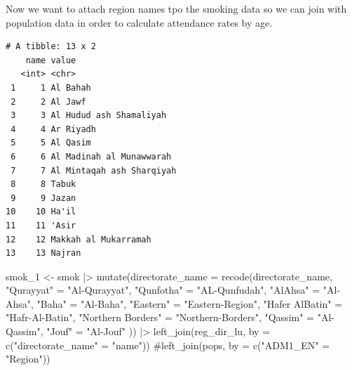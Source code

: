 \documentclass[
  letterpaper,
  DIV=11,
  numbers=noendperiod]{scrreprt}
\newenvironment{Shaded}{\begin{snugshade}}{\end{snugshade}}
\newcommand{\AttributeTok}[1]{\textcolor[rgb]{0.40,0.45,0.13}{#1}}
\newcommand{\CommentTok}[1]{\textcolor[rgb]{0.37,0.37,0.37}{#1}}
\newcommand{\FunctionTok}[1]{\textcolor[rgb]{0.28,0.35,0.67}{#1}}
\newcommand{\NormalTok}[1]{\textcolor[rgb]{0.00,0.23,0.31}{#1}}
\newcommand{\OtherTok}[1]{\textcolor[rgb]{0.00,0.23,0.31}{#1}}
\newcommand{\SpecialCharTok}[1]{\textcolor[rgb]{0.37,0.37,0.37}{#1}}
\newcommand{\StringTok}[1]{\textcolor[rgb]{0.13,0.47,0.30}{#1}}
\begin{document}
Now we want to attach region names tpo the smoking data so we can join
with population data in order to calculate attendance rates by age.

\begin{Shaded}
\end{Shaded}

\begin{verbatim}
# A tibble: 13 x 2
    name value                    
   <int> <chr>                    
 1     1 Al Bahah                 
 2     2 Al Jawf                  
 3     3 Al Hudud ash Shamaliyah  
 4     4 Ar Riyadh                
 5     5 Al Qasim                 
 6     6 Al Madinah al Munawwarah 
 7     7 Al Mintaqah ash Sharqiyah
 8     8 Tabuk                    
 9     9 Jazan                    
10    10 Ha'il                    
11    11 'Asir                    
12    12 Makkah al Mukarramah     
13    13 Najran                   
\end{verbatim}

\begin{Shaded}
\begin{Highlighting}[]
\NormalTok{smok\_1 }\OtherTok{\textless{}{-}}\NormalTok{ smok }\SpecialCharTok{|\textgreater{}}
    \FunctionTok{mutate}\NormalTok{(}\AttributeTok{directorate\_name =} \FunctionTok{recode}\NormalTok{(directorate\_name, }\StringTok{"Qurayyat"} \OtherTok{=} \StringTok{"Al{-}Qurayyat"}\NormalTok{, }
                                     \StringTok{"Qunfotha"} \OtherTok{=} \StringTok{"AL{-}Qunfudah"}\NormalTok{, }
                                     \StringTok{"AlAhsa"} \OtherTok{=} \StringTok{"Al{-}Ahsa"}\NormalTok{, }
                                     \StringTok{"Baha"} \OtherTok{=} \StringTok{"Al{-}Baha"}\NormalTok{,}
                                     \StringTok{"Eastern"} \OtherTok{=} \StringTok{"Eastern{-}Region"}\NormalTok{, }
                                     \StringTok{"Hafer AlBatin"} \OtherTok{=} \StringTok{"Hafr{-}Al{-}Batin"}\NormalTok{,}
                                     \StringTok{"Northern Borders"} \OtherTok{=} \StringTok{"Northern{-}Borders"}\NormalTok{,}
                                     \StringTok{"Qassim"} \OtherTok{=} \StringTok{"Al{-}Qassim"}\NormalTok{, }
                                     \StringTok{"Jouf"} \OtherTok{=} \StringTok{"Al{-}Jouf"}
\NormalTok{                                     )) }\SpecialCharTok{|\textgreater{}}
    \FunctionTok{left\_join}\NormalTok{(reg\_dir\_lu, }\AttributeTok{by =} \FunctionTok{c}\NormalTok{(}\StringTok{"directorate\_name"} \OtherTok{=} \StringTok{"name"}\NormalTok{)) }
    \CommentTok{\#left\_join(pops, by = c("ADM1\_EN" = "Region"))}
\end{Highlighting}
\end{Shaded}
\end{document}
